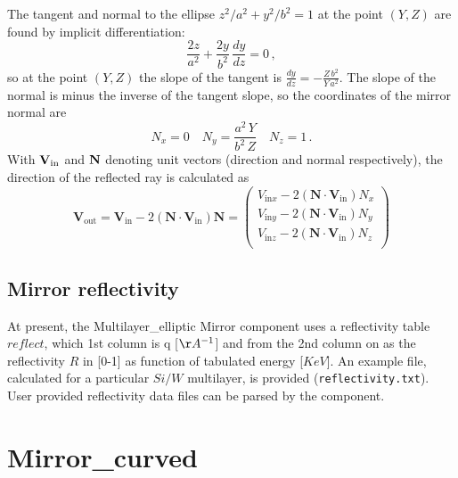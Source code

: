 The tangent and normal to the ellipse $z^2/a^2 + y^2/b^2=1$ at the
point $(Y,Z)$ are found by implicit differentiation: \begin{equation} 
\frac{2z}{a^2} + \frac{2y}{b^2} \,\frac{dy}{dz} = 0\,, \end{equation} so at the
point $(Y,Z)$ the slope of the tangent is $\frac{dy}{dz} =
-\frac{Z\,b^2}{Y\,a^2}$. The slope of the normal is minus the
inverse of the tangent slope, so the coordinates of the mirror
normal are \begin{equation} N_x = 0 \quad N_y = \frac{a^2\,Y}{b^2\,Z} \quad N_z =
1\,. \end{equation} With $\bf{V}_\textrm{in}$ and $\bf{N}$ denoting unit
vectors (direction and normal respectively), the direction of the
reflected ray is calculated as \begin{equation} \boldsymbol{{V}}_\textrm{out} =
\boldsymbol{{V}}_\textrm{in} -2(\boldsymbol{{N}}\cdot\boldsymbol{{V}}_\textrm{in})\boldsymbol{{N}} =
        \left(
      \begin{array}{c}
        V_{\textrm{in}x} - 2(\boldsymbol{{N}}\cdot\boldsymbol{{V}}_\textrm{in})N_x \\
               V_{\textrm{in}y} - 2(\boldsymbol{{N}}\cdot\boldsymbol{{V}}_\textrm{in})N_y \\
                V_{\textrm{in}z} - 2(\boldsymbol{{N}}\cdot\boldsymbol{{V}}_\textrm{in})N_z \\
      \end{array}
    \right)
\end{equation}


\subsection{Mirror reflectivity}
\label{ss:mirrorreflecttable}

At present, the Multilayer\_elliptic Mirror component uses a reflectivity table $reflect$, 
which 1st column is q [$\AA^{-1}$] and from the 2nd column on as the reflectivity $R$ in [0-1]
as function of tabulated energy [$KeV$]. 
An example file, calculated for a particular $Si/W$ multilayer, is provided (\verb+reflectivity.txt+).
User provided reflectivity data files can be parsed by the component.



\section{Mirror\_curved}
\label{mirror-curved}
 
